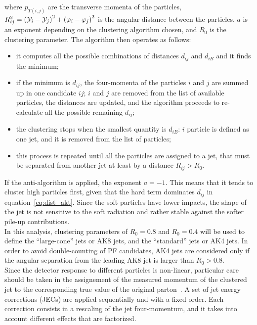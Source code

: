 \noindent where $p_{T(i,j)}$ are the transverse momenta of the particles, $R_{ij}^2 = \left( \mathcal{Y}_i - \mathcal{Y}_j \right)^2 + \left( \varphi_i - \varphi_j\right)^2$ is the angular distance between the particles, $a$ is an exponent depending on the clustering algorithm chosen, and $R_0$ is the clustering parameter. The algorithm then operates as follows:
\begin{itemize}
\item it computes all the possible combinations of distances $d_{ij}$ and $d_{iB}$ and it finds the minimum;
\item if the minimum is $d_{ij}$, the four-momenta of the particles $i$ and $j$ are summed up in one candidate $ij$; $i$ and $j$ are removed from the list of available particles, the distances are updated, and the algorithm proceeds to re-calculate all the possible remaining $d_{ij}$;
\item the clustering stops when the smallest quantity is $d_{iB}$: $i$ particle is defined as one jet, and it is removed from the list of particles;
\item this process is repeated until all the particles are assigned to a jet, that must be separated from another jet at least by a distance $R_{ij} > R_0$.
\end{itemize}
If the anti-\kt algorithm is applied, the exponent $a = -1$. This means that it tends to cluster high \pt particles first, given that the hard term dominates $d_{ij}$ in equation~\ref{eq:dist_akt}. Since the soft particles have lower impacts, the shape of the jet is not sensitive to the soft radiation and rather stable against the softer pile-up contributions.\\
In this analysis, clustering parameters of $R_0 = 0.8$ and $R_0 = 0.4$ will be used to define the ``large-cone'' jets or AK8 jets, and the ``standard'' jets or AK4 jets. In order to avoid double-counting of PF candidates, AK4 jets are considered only if the angular separation from the leading AK8 jet is larger than $R_0>0.8$.\\
Since the detector response to different particles is non-linear, particular care should be taken in the assignement of the measured momentum of the clustered jet to the corresponding true value of the original parton~\cite{bib:1748-0221-6-11-P11002}. A set of jet energy corrections (JECs) are applied sequentially and with a fixed order. Each correction consists in a rescaling of the jet four-momentum, and it takes into account different effects that are factorized.
